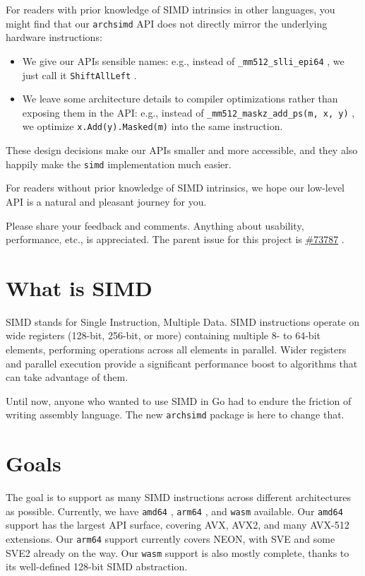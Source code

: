 \documentclass[11pt,a4paper]{article}
\begin{document}
For readers with prior knowledge of SIMD intrinsics in other languages, you might find that our \texttt{archsimd} API does not directly mirror the underlying hardware instructions:

\begin{itemize}
\item We give our APIs sensible names: e.g., instead of \texttt{_mm512_slli_epi64} , we just call it \texttt{ShiftAllLeft} .
\item We leave some architecture details to compiler optimizations rather than exposing them in the API: e.g., instead of \texttt{_mm512_maskz_add_ps(m, x, y)} , we optimize \texttt{x.Add(y).Masked(m)} into the same instruction.
\end{itemize}

These design decisions make our APIs smaller and more accessible, and they also happily make the \texttt{simd} implementation much easier.

For readers without prior knowledge of SIMD intrinsics, we hope our low-level API is a natural and pleasant journey for you.

Please share your feedback and comments. Anything about usability, performance, etc., is appreciated. The parent issue for this project is \href{https://go.dev/issue/73787}{\#73787} .

\section{What is SIMD}

SIMD stands for Single Instruction, Multiple Data. SIMD instructions operate on wide registers (128-bit, 256-bit, or more) containing multiple 8- to 64-bit elements, performing operations across all elements in parallel. Wider registers and parallel execution provide a significant performance boost to algorithms that can take advantage of them.

Until now, anyone who wanted to use SIMD in Go had to endure the friction of writing assembly language. The new \texttt{archsimd} package is here to change that.

\section{Goals}

The goal is to support as many SIMD instructions across different architectures as possible. Currently, we have \texttt{amd64} , \texttt{arm64} , and \texttt{wasm} available. Our \texttt{amd64} support has the largest API surface, covering AVX, AVX2, and many AVX-512 extensions. Our \texttt{arm64} support currently covers NEON, with SVE and some SVE2 already on the way. Our \texttt{wasm} support is also mostly complete, thanks to its well-defined 128-bit SIMD abstraction.
\end{document}
